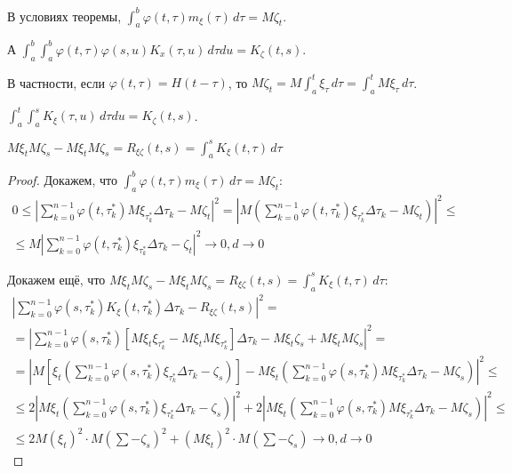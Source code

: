 \begin{corollary}
  В условиях теоремы, $\int_a^b \varphi(t, \tau) m_\xi(\tau) \, d\tau = M\zeta_t$.

  А $\int_a^b \int_a^b \varphi(t, \tau) \varphi(s, u) K_x(\tau, u) \, d\tau du = K_\zeta(t, s)$.

  В частности, если $\varphi(t, \tau) = H(t-\tau)$, то
  $M\zeta_t = M \int_a^t \xi_\tau \, d\tau = \int_a^t M\xi_\tau \, d\tau$.

  $\int_a^t \int_a^s K_\xi(\tau, u) \, d\tau du = K_\zeta(t, s)$.

  $M\xi_t M\zeta_s - M\xi_t M\zeta_s = R_{\xi \zeta} (t, s) = \int_a^s K_\xi(t, \tau) \, d\tau$
\end{corollary}
\begin{proof}
  Докажем, что $\int_a^b \varphi(t, \tau) m_\xi(\tau) \, d\tau = M\zeta_t$:
  \begin{multline*}
    0 \leqslant \left| \sum_{k=0}^{n-1} \varphi(t, \tau_k^*) M\xi_{\tau_k^*} \Delta \tau_k - M\zeta_t \right|^2
    = \left| M \left( \sum_{k=0}^{n-1} \varphi(t, \tau_k^*) \xi_{\tau_k^*} \Delta \tau_k - M\zeta_t \right) \right|^2 \leqslant  \\
    \leqslant M \left| \sum_{k=0}^{n-1} \varphi(t, \tau_k^*) \xi_{\tau_k^*} \Delta \tau_k - \zeta_t \right|^2 \to 0, d\to 0
  \end{multline*}

  Докажем ещё, что $M\xi_t M\zeta_s - M\xi_t M\zeta_s = R_{\xi \zeta} (t, s) = \int_a^s K_\xi(t, \tau) \, d\tau$:
  \begin{multline*}
    \left| \sum_{k=0}^{n-1} \varphi(s, \tau_k^*) K_\xi(t, \tau_k^*) \Delta\tau_k - R_{\xi \zeta}(t, s) \right|^2 = \\
    = \left| \sum_{k=0}^{n-1} \varphi(s, \tau_k^*) \left[ M\xi_t \xi_{\tau_k^*} - M\xi_t M\xi_{\tau_k^*} \right] \Delta\tau_k - M\xi_t\zeta_s + M\xi_t M\zeta_s \right|^2 = \\
    = \left| M \left[\xi_t \left( \sum_{k=0}^{n-1} \varphi(s, \tau_k^*) \xi_{\tau_k^*} \Delta\tau_k - \zeta_s \right) \right] - M\xi_t \left( \sum_{k=0}^{n-1} \varphi(s, \tau_k^*) M\xi_{\tau_k^*} \Delta\tau_k - M\zeta_s \right)  \right|^2 \leqslant \\
    \leqslant 2 \left| M\xi_t \left( \sum_{k=0}^{n-1} \varphi(s, \tau_k^*) \xi_{\tau_k^*} \Delta\tau_k - \zeta_s \right) \right|^2 + 2 \left| M\xi_t \left( \sum_{k=0}^{n-1} \varphi(s, \tau_k^*) M\xi_{\tau_k^*} \Delta\tau_k - M\zeta_s \right) \right|^2 \leqslant \\
    \leqslant 2 M(\xi_t)^2 \cdot M \left( \sum - \zeta_s \right)^2 + \left( M\xi_t \right)^2 \cdot
    M \left( \sum - \zeta_s \right) \to 0, d\to 0
  \end{multline*}
\end{proof}

